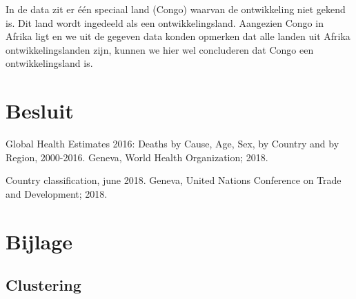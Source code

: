 \documentclass[a4paper,kulak]{kulakarticle}
\begin{document}
In de data zit er \'e\'en speciaal land (Congo) waarvan de ontwikkeling niet gekend is. Dit land wordt ingedeeld als een ontwikkelingsland. Aangezien Congo in Afrika ligt en we uit de gegeven data konden opmerken dat alle landen uit Afrika ontwikkelingslanden zijn, kunnen we hier wel concluderen dat Congo een ontwikkelingsland is. 


\section*{Besluit}



\begin{thebibliography}{9}
	
	Global Health Estimates 2016: Deaths by Cause, Age, Sex, by Country and by Region, 2000-2016.
	Geneva, World Health Organization; 2018.
	
	Country classification, june 2018. Geneva, United Nations Conference on Trade and Development;
	2018.
	
\end{thebibliography}

\newpage
\section{Bijlage} \label{b}
\subsection{Clustering}
\end{document}
